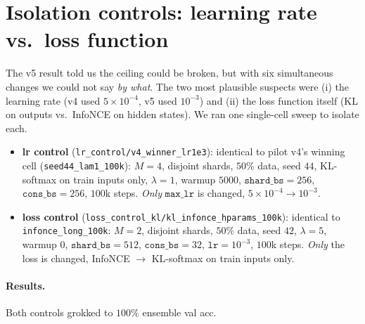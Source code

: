 \documentclass[11pt,a4paper]{article}
\begin{document}
\section{Isolation controls: learning rate vs.\ loss function}
\label{sec:controls}

The v5 result told us the ceiling could be broken, but with six
simultaneous changes we could not say \emph{by what}. The two most
plausible suspects were (i) the learning rate (v4 used $5{\times}10^{-4}$,
v5 used $10^{-3}$) and (ii) the loss function itself (KL on outputs vs.\
InfoNCE on hidden states). We ran one single-cell sweep to isolate
each.

\begin{itemize}[leftmargin=*,itemsep=3pt,topsep=3pt]
\item \textbf{lr control} (\texttt{lr\_control/v4\_winner\_lr1e3}):
      identical to pilot v4's winning cell (\texttt{seed44\_lam1\_100k}):
      $M{=}4$, disjoint shards, $50\%$ data, seed $44$, KL-softmax on
      train inputs only, $\lambda{=}1$, warmup $5000$,
      $\mathtt{shard\_bs}{=}256$, $\mathtt{cons\_bs}{=}256$, $100$k steps.
      \emph{Only} $\mathtt{max\_lr}$ is changed,
      $5{\times}10^{-4} \to 10^{-3}$.
\item \textbf{loss control} (\texttt{loss\_control\_kl/kl\_infonce\_hparams\_100k}):
      identical to \texttt{infonce\_long\_100k}:
      $M{=}2$, disjoint shards, $50\%$ data, seed $42$, $\lambda{=}5$,
      warmup $0$, $\mathtt{shard\_bs}{=}512$, $\mathtt{cons\_bs}{=}32$,
      $\mathtt{lr}{=}10^{-3}$, $100$k steps. \emph{Only} the loss is
      changed, InfoNCE $\to$ KL-softmax on train inputs only.
\end{itemize}

\paragraph{Results.} Both controls grokked to $100\%$ ensemble val acc.
\end{document}

